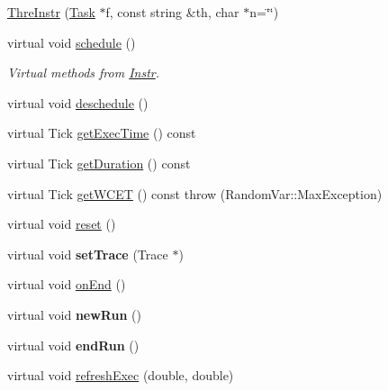\begin{DoxyCompactItemize}
\item 
\hyperlink{classRTSim_1_1ThreInstr_a830018b6ff0dde5f375fb2fe24694096}{Thre\+Instr} (\hyperlink{classRTSim_1_1Task}{Task} $\ast$f, const string \&th, char $\ast$n=\char`\"{}\char`\"{})
\item 
virtual void \hyperlink{classRTSim_1_1ThreInstr_a206e77229d59ee9e6bbdebd2cf6707ce}{schedule} ()\hypertarget{classRTSim_1_1ThreInstr_a206e77229d59ee9e6bbdebd2cf6707ce}{}\label{classRTSim_1_1ThreInstr_a206e77229d59ee9e6bbdebd2cf6707ce}

\begin{DoxyCompactList}\small\item\em Virtual methods from \hyperlink{classRTSim_1_1Instr}{Instr}. \end{DoxyCompactList}\item 
virtual void \hyperlink{classRTSim_1_1ThreInstr_ad6976c6646001eeda4cfea8794cfd883}{deschedule} ()
\item 
virtual Tick \hyperlink{classRTSim_1_1ThreInstr_a004c2a930613476497dd23a972d9a27a}{get\+Exec\+Time} () const 
\item 
virtual Tick \hyperlink{classRTSim_1_1ThreInstr_a1c89f97574477a408faa8e5ce60fc025}{get\+Duration} () const 
\item 
virtual Tick \hyperlink{classRTSim_1_1ThreInstr_a384617f381d13d838b111a9f9da3dfd8}{get\+W\+C\+ET} () const   throw (\+Random\+Var\+::\+Max\+Exception)
\item 
virtual void \hyperlink{classRTSim_1_1ThreInstr_a4375adb7c36c7a5a1c98af129e7153e5}{reset} ()
\item 
virtual void {\bfseries set\+Trace} (Trace $\ast$)\hypertarget{classRTSim_1_1ThreInstr_a11a9fbb170f943972e045a85545524b0}{}\label{classRTSim_1_1ThreInstr_a11a9fbb170f943972e045a85545524b0}

\item 
virtual void \hyperlink{classRTSim_1_1ThreInstr_a8ebb42fa6182ba1ba2f849220b15afda}{on\+End} ()
\item 
virtual void {\bfseries new\+Run} ()\hypertarget{classRTSim_1_1ThreInstr_ae2fbe0149e1ced393c124920520a6f0e}{}\label{classRTSim_1_1ThreInstr_ae2fbe0149e1ced393c124920520a6f0e}

\item 
virtual void {\bfseries end\+Run} ()\hypertarget{classRTSim_1_1ThreInstr_a4aed8866335dc10b3e24780dfce10979}{}\label{classRTSim_1_1ThreInstr_a4aed8866335dc10b3e24780dfce10979}

\item 
virtual void \hyperlink{classRTSim_1_1ThreInstr_af81904921014645cd39757bde3237cde}{refresh\+Exec} (double, double)
\end{DoxyCompactItemize}
